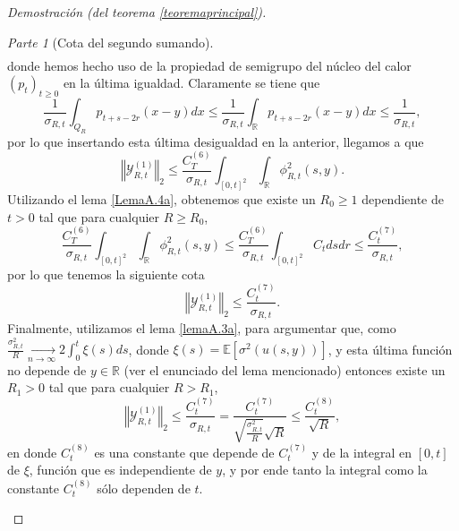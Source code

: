 \documentclass[letterpaper,twoside,12pt]{book}
\newcommand{\R}{\mathbb{R}}
\newcommand{\E}{\mathbb{E}}
\newcommand{\1}{\mathds{1}}
\renewcommand{\to}{\rightarrow}
\newcommand{\norm}[1]{\left\Vert #1 \right\Vert}
\theoremstyle{definition}
\theoremstyle{definition}
\theoremstyle{remark}
\newtheorem{proofpart}{Parte}
\theoremstyle{definition}
\theoremstyle{definition}
\theoremstyle{definition}
\theoremstyle{definition}
\theoremstyle{definition}
\begin{document}
\begin{proof}[Demostración (del teorema \ref{teoremaprincipal})]
\begin{proofpart}[Cota del segundo sumando]
\begin{align*}
\end{align*}
donde hemos hecho uso de la propiedad de semigrupo del núcleo del calor $(p_t)_{t\geq0}$ en la última igualdad. Claramente se tiene que 
\[
   \frac{1}{\sigma_{R,t}}\int_{Q_R}p_{t+s-2r}(x-y)dx\leq \frac{1}{\sigma_{R,t}}\int_{\R}p_{t+s-2r}(x-y)dx\leq \frac{1}{\sigma_{R,t}},
\]
por lo que insertando esta última desigualdad en la anterior, llegamos a que 
\[
\norm{\mathcal{Y}_{R,t}^{(1)}}_2\leq \frac{C_T^{(6)}}{\sigma_{R,t}}\int_{[0,t]^2}\int_{\R}\phi_{R,t}^2(s,y).
\]
Utilizando el lema \ref{LemaA.4a}, obtenemos que existe un $R_0\geq1$ dependiente de $t>0$ tal que para cualquier $R\geq R_0$,
\[
   \frac{C_T^{(6)}}{\sigma_{R,t}}\int_{[0,t]^2}\int_{\R}\phi_{R,t}^2(s,y)\leq \frac{C_T^{(6)}}{\sigma_{R,t}}\int_{[0,t]^2}C_t ds dr\leq \frac{C_t^{(7)}}{\sigma_{R,t}},
\]
por lo que tenemos la siguiente cota
\[
\norm{\mathcal{Y}_{R,t}^{(1)}}_2\leq \frac{C_t^{(7)}}{\sigma_{R,t}}.
\]
Finalmente, utilizamos el lema \ref{lemaA.3a}, para argumentar que, como $\tfrac{\sigma^2_{R,t}}{R} \xrightarrow[n\to\infty]{}2\int_{0}^{t}\xi(s)ds$, donde $\xi(s)=\E\left[\sigma^2(u(s,y))\right]$, y esta última función no depende de $y\in \R$ (ver el enunciado del lema mencionado) entonces existe un $R_1>0$ tal que para cualquier $R>R_1$,
\begin{equation}\label{cotafinal1}
      \norm{\mathcal{Y}_{R,t}^{(1)}}_2\leq \frac{C_t^{(7)}}{\sigma_{R,t}}=\frac{C_t^{(7)}}{\sqrt{\frac{\sigma_{R,t}^2}{R}}\sqrt{R}}\leq \frac{C_t^{(8)}}{\sqrt{R}},  
\end{equation}
en donde $C_t^{(8)}$ es una constante que depende de $C_t^{(7)}$ y de la integral en $[0,t]$ de $\xi$, función que es independiente de $y$, y por ende tanto la integral como la constante $C_t^{(8)}$ sólo dependen de $t$.


\end{proofpart}
\end{proof}
\end{document}

